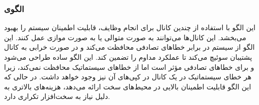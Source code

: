 \subsubsection{الگوی }
\label{archSafeHomoRedundancySec}
\begin{RTL}
این الگو با استفاده از چندین کانال برای انجام وظایف، قابلیت اطمینان
سیستم را بهبود می‌بخشد. این کانال‌ها می‌توانند به صورت متوالی یا به صورت موازی
عمل کنند. این الگو از سیستم در برابر خطاهای تصادفی محافظت می‌کند و
در صورت خرابی به کانال پشتیبان سوئیچ می‌کند تا عملکرد مداوم را
تضمین کند. این الگو ساده طراحی می‌شود و برای خطاهای تصادفی مؤثر است
اما از خطاهای سیستماتیک محافظت نمی‌کند، زیرا هر خطای سیستماتیک در یک
کانال در کپی‌های آن نیز وجود خواهد داشت. در حالی که این الگو قابلیت
اطمینان بالایی در محیط‌های سخت ارائه می‌دهد، هزینه‌های بالاتری
به دلیل نیاز به سخت‌افزار تکراری دارد.
\end{RTL}